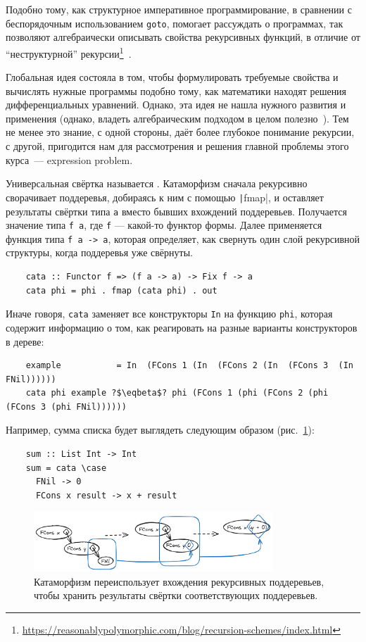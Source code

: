 Подобно тому, как структурное императивное программирование, в сравнении с беспорядочным использованием \texttt{goto}, помогает рассуждать о программах, так  позволяют алгебраически описывать свойства рекурсивных функций, в отличие от ``неструктурной'' рекурсии\footnote{\url{https://reasonablypolymorphic.com/blog/recursion-schemes/index.html}}~\cite{meijer1991functional, meijer1995bananas}.

Глобальная идея состояла в том, чтобы формулировать требуемые свойства и вычислять нужные программы подобно тому, как математики находят решения дифференциальных уравнений.
Однако, эта идея не нашла нужного развития и применения (однако, владеть алгебраическим подходом в целом полезно~\cite{maguire-algebra}).
Тем не менее это знание, с одной стороны, даёт более глубокое понимание рекурсии, с другой, пригодится нам для рассмотрения и решения главной проблемы этого курса~--- expression problem.

Универсальная свёртка называется .
Катаморфизм сначала рекурсивно сворачивает поддеревья, добираясь к ним с помощью \texttt|fmap|, и оставляет результаты свёртки типа \texttt{a} вместо бывших вхождений поддеревьев.
Получается значение типа \texttt{f a}, где \texttt{f} --- какой-то функтор формы.
Далее применяется функция типа \texttt{f a -> a}, которая определяет, как свернуть один слой рекурсивной структуры, когда поддеревья уже свёрнуты.
\begin{verbatim}
    cata :: Functor f => (f a -> a) -> Fix f -> a
    cata phi = phi . fmap (cata phi) . out
\end{verbatim}
Иначе говоря, \texttt{cata} заменяет все конструкторы \texttt{In} на функцию \texttt{phi}, которая содержит информацию о том, как реагировать на разные варианты конструкторов в дереве:
\begin{verbatim}
    example           = In  (FCons 1 (In  (FCons 2 (In  (FCons 3  (In  FNil))))))
    cata phi example ?$\eqbeta$? phi (FCons 1 (phi (FCons 2 (phi (FCons 3 (phi FNil))))))
\end{verbatim}

Например, сумма списка будет выглядеть следующим образом (рис.~\ref{fig:cata-step}):
\begin{verbatim}
    sum :: List Int -> Int
    sum = cata \case
      FNil -> 0
      FCons x result -> x + result
\end{verbatim}

\begin{figure}
    \centering
    \includegraphics[width=0.8\textwidth]{figs/cataStep.excalidraw}
    \caption{Катаморфизм переиспользует вхождения рекурсивных поддеревьев, чтобы хранить результаты свёртки соответствующих поддеревьев.}
    \label{fig:cata-step}
\end{figure}

